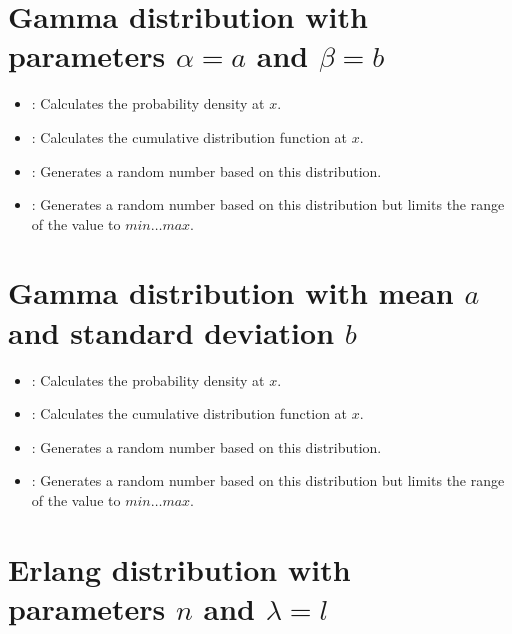 \section{Gamma distribution with parameters \texorpdfstring{$\alpha=a$}{a} and \texorpdfstring{$\beta=b$}{b}}

\begin{itemize}

\item
{}:
Calculates the probability density at $x$.

\item
{}:
Calculates the cumulative distribution function at $x$.

\item
{}:
Generates a random number based on this distribution.

\item
{}:
Generates a random number based on this distribution but limits the range of the value to $min\ldots max$.

\end{itemize}



\section{Gamma distribution with mean \texorpdfstring{$a$}{a} and standard deviation \texorpdfstring{$b$}{b}}

\begin{itemize}

\item
{}:
Calculates the probability density at $x$.

\item
{}:
Calculates the cumulative distribution function at $x$.

\item
{}:
Generates a random number based on this distribution.

\item
{}:
Generates a random number based on this distribution but limits the range of the value to $min\ldots max$.

\end{itemize}



\section{Erlang distribution with parameters \texorpdfstring{$n$}{n} and \texorpdfstring{$\lambda=l$}{l}}

